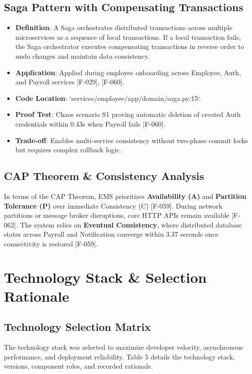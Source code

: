 \documentclass[11pt,a4paper]{article}
\begin{document}
\subsection{Saga Pattern with Compensating Transactions}
\begin{itemize}
    \item \textbf{Definition}: A Saga orchestrates distributed transactions across multiple microservices as a sequence of local transactions. If a local transaction fails, the Saga orchestrator executes compensating transactions in reverse order to undo changes and maintain data consistency.
    \item \textbf{Application}: Applied during employee onboarding across Employee, Auth, and Payroll services [F-029], [F-060].
    \item \textbf{Code Location}: `services/employee/app/domain/saga.py:15`.
    \item \textbf{Proof Test}: Chaos scenario S1 proving automatic deletion of created Auth credentials within 0.43s when Payroll fails [F-060].
    \item \textbf{Trade-off}: Enables multi-service consistency without two-phase commit locks but requires complex rollback logic.
\end{itemize}

\subsection{CAP Theorem \& Consistency Analysis}
In terms of the CAP Theorem, EMS prioritizes \textbf{Availability (A)} and \textbf{Partition Tolerance (P)} over immediate Consistency (C) [F-059]. During network partitions or message broker disruptions, core HTTP APIs remain available [F-062]. The system relies on \textbf{Eventual Consistency}, where distributed database states across Payroll and Notification converge within 3.37 seconds once connectivity is restored [F-059].

\section{Technology Stack \& Selection Rationale}

\subsection{Technology Selection Matrix}
The technology stack was selected to maximize developer velocity, asynchronous performance, and deployment reliability. Table 5 details the technology stack, versions, component roles, and recorded rationale.
\end{document}
